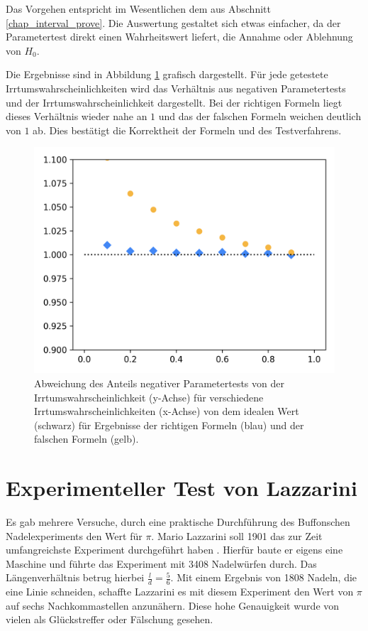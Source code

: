 \documentclass[10pt,twocolumn]{scrartcl}
\begin{document}
		Das Vorgehen entspricht im Wesentlichen dem aus Abschnitt \ref{chap_interval_prove}. Die Auswertung gestaltet sich etwas einfacher, da der Parametertest direkt einen Wahrheitswert liefert, die Annahme oder Ablehnung von $H_0$.

		Die Ergebnisse sind in Abbildung \ref{fig_test_mean_dot} grafisch dargestellt. Für jede getestete Irrtumswahrscheinlichkeiten wird das Verhältnis aus negativen Parametertests und der Irrtumswahrscheinlichkeit dargestellt. Bei der richtigen Formeln liegt dieses Verhältnis wieder nahe an $1$ und das der falschen Formeln weichen deutlich von $1$ ab. Dies bestätigt die Korrektheit der Formeln und des Testverfahrens.

		\begin{figure}[H]
			\centering
			\includegraphics[width=0.9\columnwidth]{images/mean_test.png}
			\caption{Abweichung des Anteils negativer Parametertests von der Irrtumswahrscheinlichkeit (y-Achse) für verschiedene Irrtumswahrscheinlichkeiten (x-Achse) von dem idealen Wert (schwarz) für Ergebnisse der richtigen Formeln (blau) und der falschen Formeln (gelb).}
			\label{fig_test_mean_dot}
		\end{figure}

\section{Experimenteller Test von Lazzarini}
	Es gab mehrere Versuche, durch eine praktische Durchführung des Buffonschen Nadelexperiments den Wert für $\pi$. Mario Lazzarini soll 1901 das zur Zeit umfangreichste Experiment durchgeführt haben \cite{History}. Hierfür baute er eigens eine Maschine und führte das Experiment mit 3408 Nadelwürfen durch. Das Längenverhältnis betrug hierbei ${\tfrac {l}{d}={\tfrac {5}{6}}}$. Mit einem Ergebnis von 1808 Nadeln, die eine Linie schneiden, schaffte Lazzarini es mit diesem Experiment den Wert von $\pi$ auf sechs Nachkommastellen anzunähern. Diese hohe Genauigkeit wurde von vielen als Glückstreffer oder Fälschung gesehen.\cite{Badger}
\end{document}
